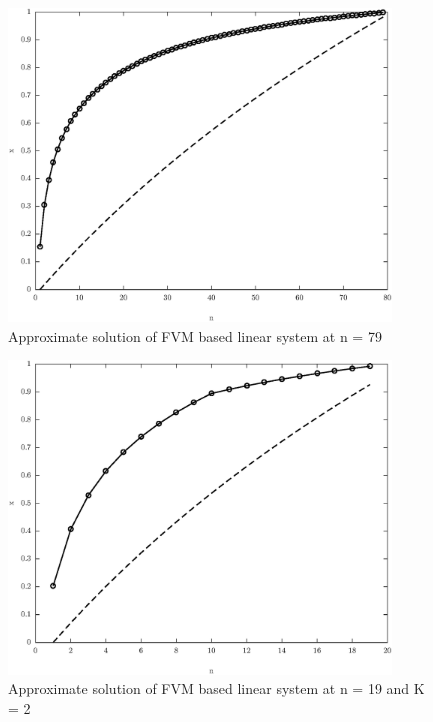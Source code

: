 \documentclass[11pt]{article}
\begin{document}
\begin{figure}[!hbt]
\begin{center}
	\includegraphics[width=4in]{math609_pa1_comp_example_1_n_79.eps}
	\caption{Approximate solution of FVM based linear system at n = 79}
\end{center}
\end{figure}

\begin{figure}[!hbt]
\begin{center}
	\includegraphics[width=4in]{math609_pa1_comp_example_1_n_19_k_2.eps}
	\caption{Approximate solution of FVM based linear system at n = 19 and K = 2}
\end{center}
\end{figure}
\end{document}

